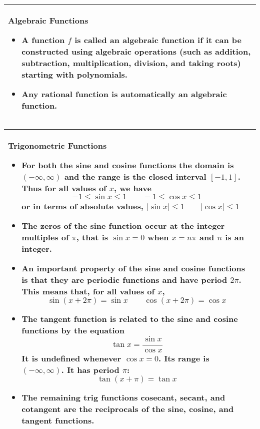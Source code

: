 \documentclass[fleqn]{article}
\begin{document}
\begin{center}
\def\arraystretch{1.3}
{\setlength{\tabcolsep}{16pt}
\begin{tabularx}{.9\textwidth}{|X|}
\hline
	\vspace{1pt}
	\textbf{Algebraic Functions}
	\begin{itemize}
	\item A function $f$ is called an \textbf{algebraic function} if it can be constructed using algebraic operations (such as addition, subtraction, multiplication, division, and taking roots) starting with polynomials.
	\item Any rational function is automatically an algebraic function.
	\end{itemize} \\
\hline
\end{tabularx}}
\vspace{12pt}	

\def\arraystretch{1.3}
{\setlength{\tabcolsep}{16pt}
\begin{tabularx}{.9\textwidth}{|X|}
\hline
	\vspace{1pt}
	\textbf{Trigonometric Functions}
	\begin{itemize}
	\item For both the sine and cosine functions the domain is $(-\infty, \infty)$ and the range is the closed interval $[-1, 1]$. Thus for all values of $x$, we have
	$$-1 \le \sin x \le 1 \hspace{24pt} -1 \le \cos x \le 1$$
	or in terms of absolute values, \hspace{12pt} $|\sin x| \le 1 \hspace{24pt} |\cos x| \le 1$
	\item The zeros of the sine function occur at the integer multiples of $\pi$, that is $\sin x = 0$ when $x=n\pi$ and $n$ is an integer.
	\item An important property of the sine and cosine functions is that they are periodic functions and have period $2\pi$. This means that, for all values of $x$,
	$$\sin(x+2\pi) = \sin x \hspace{24pt} \cos(x+2\pi) = \cos x$$
	\item The tangent function is related to the sine and cosine functions by the equation
	$$\tan x = \dfrac{\sin x}{\cos x}$$
	It is undefined whenever $\cos x = 0$. Its range is $(-\infty, \infty)$. It has period $\pi$:
	$$\tan(x+\pi) = \tan x$$
	\item The remaining trig functions cosecant, secant, and cotangent are the reciprocals of the sine, cosine, and tangent functions.
	\end{itemize} \\
\hline
\end{tabularx}}
\vspace{12pt}	


\end{center}
\end{document}
